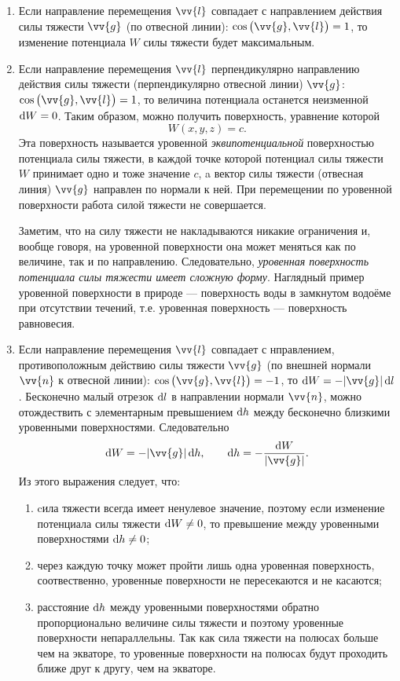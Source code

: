 \documentclass[11pt, a4paper]{article}
\theoremstyle{plain}
\theoremstyle{definition}
\theoremstyle{remark}
\begin{document}
\begin{enumerate}
    \item Если направление перемещения $\vv{l}$ совпадает с направлением действия силы тяжести $\vv{g}$ (по отвесной линии): $\cos\left( \vv{g}, \vv{l} \right) = 1$, то изменение потенциала $W$ силы тяжести будет максимальным.
    \item Если направление перемещения $\vv{l}$ перпендикулярно направлению действия силы тяжести (перпендикулярно отвесной линии) $\vv{g}$: $\cos\left( \vv{g}, \vv{l} \right) = 1$, то величина потенциала останется неизменной $\dif W = 0$. Таким образом, можно получить поверхность, уравнение которой
        \begin{equation*}
            W\left( x, y, z \right) = c.
        \end{equation*}
	Эта поверхность называется уровенной \textit{эквипотенциальной} поверхностью потенциала силы тяжести, в каждой точке которой потенциал силы тяжести $W$ принимает одно и тоже значение $c$, a вектор силы тяжести (отвесная линия) $\vv{g}$ направлен по нормали к ней. При перемещении по уровенной поверхности работа силой тяжести не совершается.
	
	Заметим, что на силу тяжести не накладываются никакие ограничения и, вообще говоря, на уровенной поверхности она может меняться как по величине, так и по направлению. Следовательно, \textit{уровенная поверхность потенциала силы тяжести имеет сложную форму}.
	Наглядный пример уровенной поверхности в природе --- поверхность воды в замкнутом водоёме при отсутствии течений, т.е. уровенная поверхность --- поверхность равновесия.
    \item Если направление перемещения $\vv{l}$ совпадает с нправлением, противоположным действию силы тяжести $\vv{g}$ (по внешней нормали $\vv{n}$ к отвесной линии): $\cos\left( \vv{g}, \vv{l} \right) = -1$, то $\dif W = - |\vv{g}| \dif l$. Бесконечно малый отрезок $\dif l$ в направлении нормали $\vv{n}$, можно отождествить с элементарным превышением $\dif h$ между бесконечно близкими уровенными поверхностями. Следовательно
        \begin{equation*}
            \dif W = - |\vv{g}| \dif h, \qquad \dif h = -\dfrac{\dif W}{|\vv{g}|}.     
        \end{equation*}
        Из этого выражения следует, что:
        \begin{enumerate}
        	\item cила тяжести всегда имеет ненулевое значение, поэтому если изменение потенциала силы тяжести $\dif W \neq 0$, то превышение между уровенными поверхностями $\dif h \neq 0$;
        	\item через каждую точку может пройти лишь одна уровенная поверхность, соотвественно, уровенные поверхности не пересекаются и не касаются;
        	\item расстояние $\dif h$ между уровенными поверхностями обратно пропорционально величине силы тяжести и поэтому уровенные поверхности непараллельны. Так как сила тяжести на полюсах больше чем на экваторе, то уровенные поверхности на полюсах будут проходить ближе друг к другу, чем на экваторе.
        \end{enumerate}


\end{enumerate}
\end{document}
